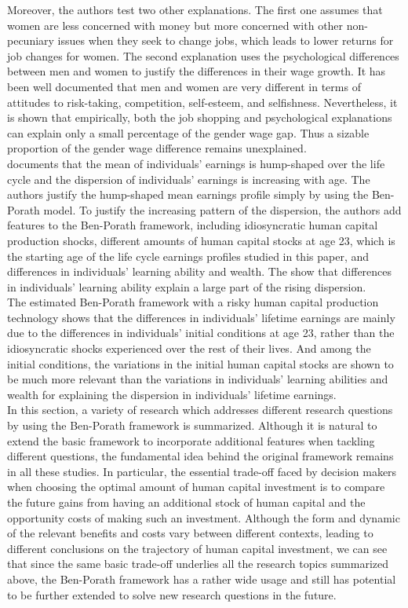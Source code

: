 \indent Moreover, the authors test two other explanations. The first one assumes that women are less concerned with money but more concerned with other non-pecuniary issues when they seek to change jobs, which leads to lower returns for job changes for women. The second explanation uses the psychological differences between men and women to justify the differences in their wage growth. It has been well documented that men and women are very different in terms of attitudes to risk-taking, competition, self-esteem, and selfishness. Nevertheless, it is shown that empirically, both the job shopping and psychological explanations can explain only a small percentage of the gender wage gap. Thus a sizable proportion of the gender wage difference remains unexplained.\\
\indent \citet{Huggett2011sources} documents that the mean of individuals' earnings is hump-shaped over the life cycle and the dispersion of individuals' earnings is increasing with age. The authors justify the hump-shaped mean earnings profile simply by using the Ben-Porath model. To justify the increasing pattern of the dispersion, the authors add features to the Ben-Porath framework, including idiosyncratic human capital production shocks, different amounts of human capital stocks at age 23, which is the starting age of the life cycle earnings profiles studied in this paper, and differences in individuals' learning ability and wealth. The show that differences in individuals' learning ability explain a large part of the rising dispersion.\\
\indent The estimated Ben-Porath framework with a risky human capital production technology shows that the differences in individuals' lifetime earnings are mainly due to the differences in individuals' initial conditions at age 23, rather than the idiosyncratic shocks experienced over the rest of their lives. And among the initial conditions, the variations in the initial human capital stocks are shown to be much more relevant than the variations in individuals' learning abilities and wealth for explaining the dispersion in individuals' lifetime earnings. \\
\indent In this section, a variety of research which addresses different research questions by using the Ben-Porath framework is summarized. Although it is natural to extend the basic framework to incorporate additional features when tackling different questions, the fundamental idea behind the original framework remains in all these studies. In particular, the essential trade-off faced by decision makers when choosing the optimal amount of human capital investment is to compare the future gains from having an additional stock of human capital and the opportunity costs of making such an investment. Although the form and dynamic of the relevant benefits and costs vary between different contexts, leading to different conclusions on the trajectory of human capital investment, we can see that since the same basic trade-off underlies all the research topics summarized above, the Ben-Porath framework has a rather wide usage and still has potential to be further extended to solve new research questions in the future. \\